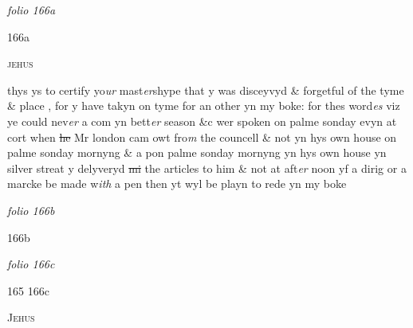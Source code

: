 \documentclass[12pt, a4paper]{book}
\begin{document}
\dotfill
					

\textit{folio 166a}


\begin{flushright}{\color{Gray}166a}\end{flushright}
 	
 		
				\begin{center}  {\scshape 
 			jehus
			
 		}  \end{center}
			
 		
 			
		\ifthenelse{\isodd{\thepage}}
		{\reversemarginpar}
		{\normalmarginpar}
		thys ys to certify yo\textit{ur} mast\textit{er}shype that y was disceyvyd \& forgetful of the tyme \& place
			, for y have takyn on tyme for an other yn my boke: for thes word\textit{es} viz ye could nev\textit{er} a com yn bett\textit{er} season \&c wer spoken on palme sonday evyn at cort when \sout{he}
               Mr london 
			cam owt fro\textit{m} the councell \& not yn hys own house on palme sonday mornyng \& a pon palme sonday mornyng yn hys own house yn silver streat y delyveryd \sout{mi} the articles to him \& not at aft\textit{er }noon yf a dirig or a marcke be made w\textit{ith} a pen then  yt wyl be playn to rede yn my boke
			
 		
 	

\dotfill
					

\textit{folio 166b}


 	\begin{flushright}{\color{Gray}166b}\end{flushright}

\dotfill
					

\textit{folio 166c}


 	\begin{flushright}{\color{Mahogany}165} {\color{Gray}166c}\end{flushright}
 	
 		
				\begin{center}  {\scshape Jehus}  \end{center}
			
\end{document}
